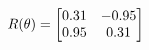 \documentclass[preview]{standalone}
\begin{document}
\begin{align*}
\special{dvisvgm:raw <g id='unique000'>}R(\theta) = \begin{bmatrix}0.31 & -0.95\\0.95 & 0.31\end{bmatrix}\special{dvisvgm:raw </g>}
\end{align*}
\end{document}
